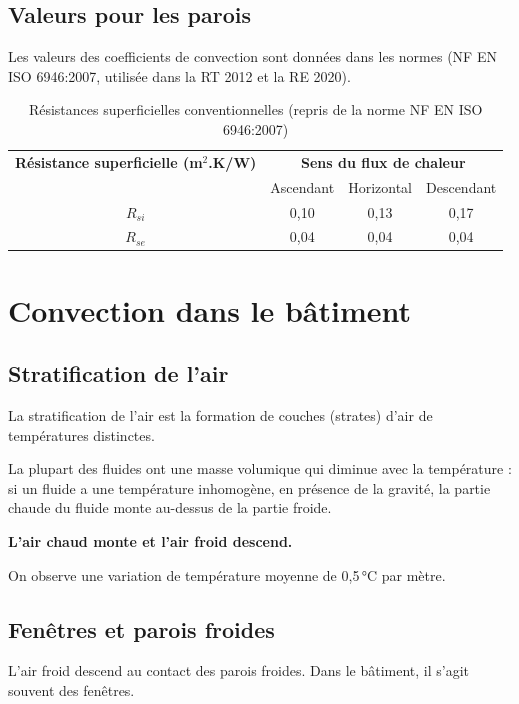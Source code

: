 \subsection*{Valeurs pour les parois}
Les valeurs des coefficients de convection sont données dans les normes (NF EN ISO 6946:2007, utilisée dans la RT 2012 et la RE 2020).

\begin{table}[htbp]
\centering
\label{tab:rsi-rse}
\begin{tabular}{c|c|c|c}

\textbf{Résistance superficielle (m$^2$.K/W)} & \multicolumn{3}{c}{\textbf{Sens du flux de chaleur}} \\
 & Ascendant & Horizontal & Descendant \\
\hline
$R_{si}$ & 0,10 & 0,13 & 0,17 \\
$R_{se}$ & 0,04 & 0,04 & 0,04 \\

\end{tabular}
\caption{Résistances superficielles conventionnelles (repris de la norme NF EN ISO 6946:2007)}
\end{table}


\section{Convection dans le bâtiment}

\subsection*{Stratification de l'air}
La stratification de l'air est la formation de couches (strates) d'air de températures distinctes.

La plupart des fluides ont une masse volumique qui diminue avec la température : si un fluide a une température inhomogène, en présence de la gravité, la partie chaude du fluide monte au-dessus de la partie froide.

\textbf{L'air chaud monte et l'air froid descend.}

On observe une variation de température moyenne de 0,5\,°C par mètre.

\subsection*{Fenêtres et parois froides}
L'air froid descend au contact des parois froides. Dans le bâtiment, il s'agit souvent des fenêtres.

